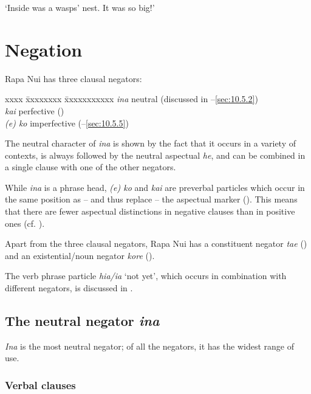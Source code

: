 \glt 
‘Inside was a wasps’ nest. It was so big!’ \textstyleExampleref{[R133.004]}\textstyleExampleref{} 
\z
{}
\section{Negation}\label{sec:10.5}
Rapa Nui has three clausal negators:
\begin{tabbing}
xxxx \= xxxxxxxx \= xxxxxxxxxxx\kill
\> \textit{{\ꞌ}ina} \>    neutral (discussed in –\ref{sec:10.5.2})\\
\> \textit{kai}   \>  perfective ()\\
\> \textit{(e) ko}   \>  imperfective (–\ref{sec:10.5.5})
\end{tabbing}

The neutral character of \textit{{\ꞌ}ina} is shown by the fact that it occurs in a variety of contexts, is always followed by the neutral aspectual \textit{he}, and can be combined in a single clause with one of the other negators.

While \textit{{\ꞌ}ina} is a phrase head, \textit{(e) ko} and \textit{kai} are preverbal particles which occur in the same position as – and thus replace – the aspectual marker (). This means that there are fewer aspectual distinctions in negative clauses than in positive ones (cf. \citealt[129]{Dixon2012}).

Apart from the three clausal negators, Rapa Nui has a constituent negator \textit{\mbox{ta{\ꞌ}e}} () and an existential/noun negator \textit{kore} (). 

The verb phrase particle \textit{hia/ia} ‘not yet’, which occurs in combination with different negators, is discussed in .

\subsection{The neutral negator \textit{{\ꞌ}ina}}\label{sec:10.5.1}

\textit{{\ꞌ}Ina} is the most neutral negator; of all the negators, it has the widest range of use. 

\subsubsection{Verbal clauses}\label{sec:10.5.1.1}

